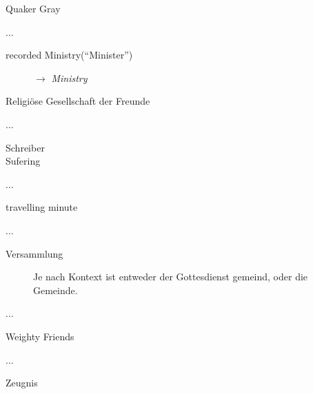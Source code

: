 \begin{description}
\begin{description}
 \item[Quaker Gray]
 \end{description}
 \item[R]...
\begin{description}
 \item[recorded Ministry("`Minister"')] $\to$ \textit{Ministry}
 \item[Religiöse Gesellschaft der Freunde]
 \end{description}
 \item[S]...
\begin{description}
 \item[Schreiber]
 \item[Sufering]
 \end{description}
 \item[T]...
\begin{description}
 \item[travelling minute]
 \end{description}
 \item[V]...
\begin{description}
 \item[Versammlung] Je nach Kontext ist entweder der Gottesdienst gemeind, oder die Gemeinde.
 \end{description}
 \item[W]...
\begin{description}
 \item[Weighty Friends]
 \end{description}
 \item[Z]...
\begin{description}
 \item[Zeugnis]
 \end{description}
 \end{description}